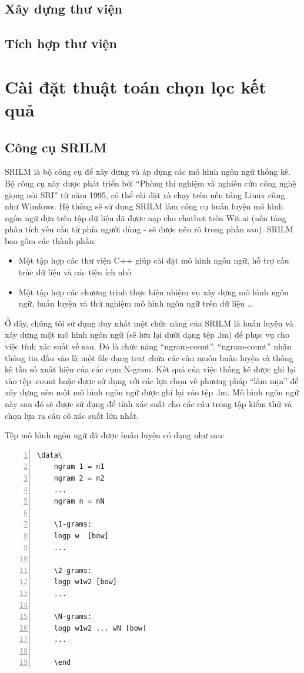 \documentclass[12pt]{report}
\begin{document}
\subsection{Xây dựng thư viện}

\subsection{Tích hợp thư viện}

\section{Cài đặt thuật toán chọn lọc kết quả}

\subsection{Công cụ SRILM}
SRILM là bộ công cụ để xây dựng và áp dụng các mô hình ngôn ngữ thống kê. Bộ công cụ này được phát triển bởi “Phòng thí nghiệm và nghiên cứu công nghệ giọng nói SRI” từ năm 1995, có thể cài đặt và chạy trên nền tảng Linux cũng như Windows.
Hệ thống sẽ sử dụng SRILM làm công cụ huấn luyện mô hình ngôn ngữ dựa trên tập dữ liệu đã được nạp cho chatbot trên Wit.ai (nền tảng phân tích yêu cầu từ phía người dùng - sẽ được nêu rõ trong phần sau). SRILM bao gồm các thành phần:

\begin{itemize}
	\item Một tập hợp các thư viện C++ giúp cài đặt mô hình ngôn ngữ, hỗ trợ cấu trúc dữ liệu và các tiện ích nhỏ
	\item Một tập hợp các chương trình thực hiện nhiệm vụ xây dựng mô hình ngôn ngữ, huấn luyện và thử nghiệm mô hình ngôn ngữ trên dữ liệu …
\end{itemize}

Ở đây, chúng tôi sử dụng duy nhất một chức năng của SRILM là huấn luyện và xây dựng một mô hình ngôn ngữ (sẽ lưu lại dưới dạng tệp .lm) để phục vụ cho việc tính xác suất về sau. Đó là chức năng “ngram-count”. “ngram-count” nhận thông tin đầu vào là một file dạng text chứa các câu muốn huấn luyện và thống kê tần số xuất hiện của các cụm N-gram. Kết quả của việc thống kê được ghi lại vào tệp .count hoặc được sử dụng với các lựa chọn về phương pháp “làm mịn” để xây dựng nên một mô hình ngôn ngữ được ghi lại vào tệp .lm. Mô hình ngôn ngữ này sau đó sẽ được sử dụng để tính xác suất cho các câu trong tập kiểm thử và chọn lựa ra câu có xác suất lớn nhất.

Tệp mô hình ngôn ngữ đã được huấn luyện có dạng như sau:
\begin{lstlisting}[frame=lines, basicstyle=\footnotesize\ttfamily, numbers=left, numberstyle=\tiny\color{black},caption= {Cấu trúc một mô hình ngôn ngữ}, backgroundcolor=\color{background}]
	\data\
	ngram 1 = n1
	ngram 2 = n2
	...
	ngram n = nN

	\1-grams:
	logp w  [bow]
	...

	\2-grams:
	logp w1w2 [bow]
	...

	\N-grams:
	logp w1w2 ... wN [bow]
	...

	\end
\end{lstlisting}
		
\end{document}
